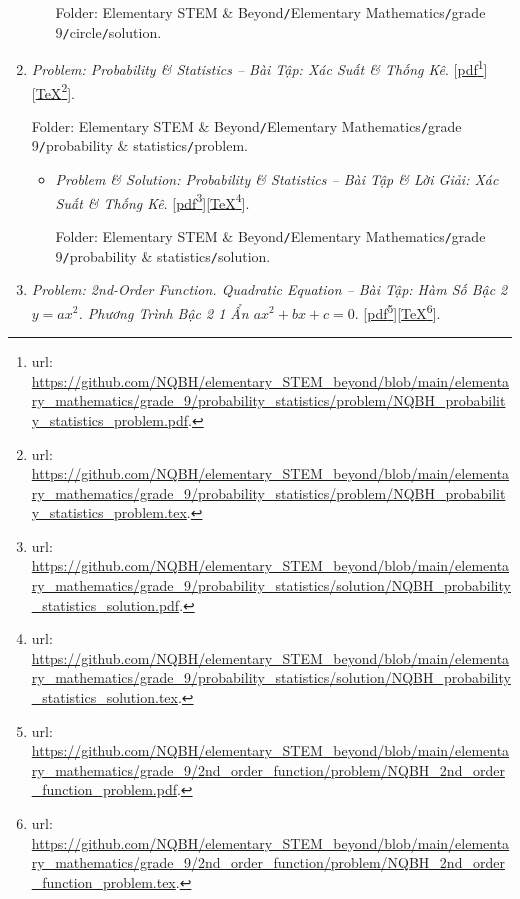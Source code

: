 \documentclass[12pt,oneside]{book}
\begin{document}
\begin{enumerate}
\begin{itemize}
		Folder: {\sf Elementary STEM \& Beyond{\tt/}Elementary Mathematics{\tt/}grade 9{\tt/}circle{\tt/}solution}.
	\end{itemize}
	\item {\it Problem: Probability \& Statistics -- Bài Tập: Xác Suất \& Thống Kê}. [\href{https://github.com/NQBH/elementary_STEM_beyond/blob/main/elementary_mathematics/grade_9/probability_statistics/problem/NQBH_probability_statistics_problem.pdf}{pdf}\footnote{{\sc url}: \url{https://github.com/NQBH/elementary_STEM_beyond/blob/main/elementary_mathematics/grade_9/probability_statistics/problem/NQBH_probability_statistics_problem.pdf}.}][\href{https://github.com/NQBH/elementary_STEM_beyond/blob/main/elementary_mathematics/grade_9/probability_statistics/problem/NQBH_probability_statistics_problem.tex}{\TeX}\footnote{{\sc url}: \url{https://github.com/NQBH/elementary_STEM_beyond/blob/main/elementary_mathematics/grade_9/probability_statistics/problem/NQBH_probability_statistics_problem.tex}.}].
	
	Folder: {\sf Elementary STEM \& Beyond{\tt/}Elementary Mathematics{\tt/}grade 9{\tt/}probability \& statistics{\tt/}problem}.
	\begin{itemize}
		\item {\it Problem \& Solution: Probability \& Statistics -- Bài Tập \& Lời Giải: Xác Suất \& Thống Kê}. [\href{https://github.com/NQBH/elementary_STEM_beyond/blob/main/elementary_mathematics/grade_9/probability_statistics/solution/NQBH_probability_statistics_solution.pdf}{pdf}\footnote{{\sc url}: \url{https://github.com/NQBH/elementary_STEM_beyond/blob/main/elementary_mathematics/grade_9/probability_statistics/solution/NQBH_probability_statistics_solution.pdf}.}][\href{https://github.com/NQBH/elementary_STEM_beyond/blob/main/elementary_mathematics/grade_9/probability_statistics/solution/NQBH_probability_statistics_solution.tex}{\TeX}\footnote{{\sc url}: \url{https://github.com/NQBH/elementary_STEM_beyond/blob/main/elementary_mathematics/grade_9/probability_statistics/solution/NQBH_probability_statistics_solution.tex}.}].
		
		Folder: {\sf Elementary STEM \& Beyond{\tt/}Elementary Mathematics{\tt/}grade 9{\tt/}probability \& statistics{\tt/}solution}.
	\end{itemize}
	\item {\it Problem: 2nd-Order Function. Quadratic Equation -- Bài Tập: Hàm Số Bậc 2 $y = ax^2$. Phương Trình Bậc 2 1 Ẩn $ax^2 + bx + c = 0$}. [\href{https://github.com/NQBH/elementary_STEM_beyond/blob/main/elementary_mathematics/grade_9/2nd_order_function/problem/NQBH_2nd_order_function_problem.pdf}{pdf}\footnote{{\sc url}: \url{https://github.com/NQBH/elementary_STEM_beyond/blob/main/elementary_mathematics/grade_9/2nd_order_function/problem/NQBH_2nd_order_function_problem.pdf}.}][\href{https://github.com/NQBH/elementary_STEM_beyond/blob/main/elementary_mathematics/grade_9/2nd_order_function/problem/NQBH_2nd_order_function_problem.tex}{\TeX}\footnote{{\sc url}: \url{https://github.com/NQBH/elementary_STEM_beyond/blob/main/elementary_mathematics/grade_9/2nd_order_function/problem/NQBH_2nd_order_function_problem.tex}.}].
	

\end{enumerate}
\end{document}
